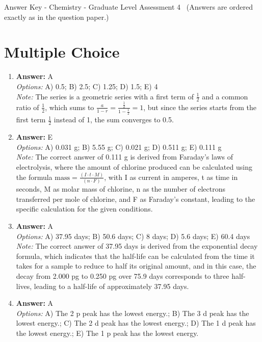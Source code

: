 \documentclass[12pt]{article}
\begin{document}
\begin{center}
Answer Key - Chemistry - Graduate Level Assessment 4 \
\small (Answers are ordered exactly as in the question paper.)
\end{center}

\section*{Multiple Choice}
\begin{enumerate}[label=\arabic*.]
\item \textbf{Answer:} A
\\ \textit{Options:} A) 0.5; B) 2.5; C) 1.25; D) 1.5; E) 4
\\ \textit{Note:} The series is a geometric series with a first term of \( \frac{1}{2} \) and a common ratio of \( \frac{1}{2} \), which sums to \( \frac{a}{1 - r} = \frac{\frac{1}{2}}{1 - \frac{1}{2}} = 1 \), but since the series starts from the first term \( \frac{1}{2} \) instead of 1, the sum converges to 0.5.
\item \textbf{Answer:} E
\\ \textit{Options:} A) 0.031 g; B) 5.55 g; C) 0.021 g; D) 0.511 g; E) 0.111 g
\\ \textit{Note:} The correct answer of 0.111 g is derived from Faraday's laws of electrolysis, where the amount of chlorine produced can be calculated using the formula \( \text{mass} = \frac{(I \cdot t \cdot M)}{(n \cdot F)} \), with I as current in amperes, t as time in seconds, M as molar mass of chlorine, n as the number of electrons transferred per mole of chlorine, and F as Faraday's constant, leading to the specific calculation for the given conditions.
\item \textbf{Answer:} A
\\ \textit{Options:} A) 37.95 days; B) 50.6 days; C) 8 days; D) 5.6 days; E) 60.4 days
\\ \textit{Note:} The correct answer of 37.95 days is derived from the exponential decay formula, which indicates that the half-life can be calculated from the time it takes for a sample to reduce to half its original amount, and in this case, the decay from 2.000 pg to 0.250 pg over 75.9 days corresponds to three half-lives, leading to a half-life of approximately 37.95 days.
\item \textbf{Answer:} A
\\ \textit{Options:} A) The 2 p peak has the lowest energy.; B) The 3 d peak has the lowest energy.; C) The 2 d peak has the lowest energy.; D) The 1 d peak has the lowest energy.; E) The 1 p peak has the lowest energy.

\end{enumerate}
\end{document}
